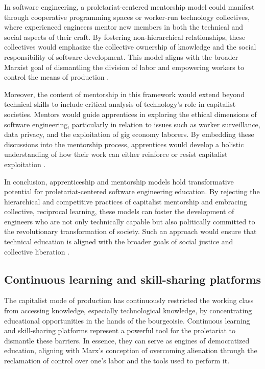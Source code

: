 \begin{refsection}
In software engineering, a proletariat-centered mentorship model could manifest through cooperative programming spaces or worker-run technology collectives, where experienced engineers mentor new members in both the technical and social aspects of their craft. By fostering non-hierarchical relationships, these collectives would emphasize the collective ownership of knowledge and the social responsibility of software development. This model aligns with the broader Marxist goal of dismantling the division of labor and empowering workers to control the means of production \cite[pp.~120]{kling1996computerization}.

Moreover, the content of mentorship in this framework would extend beyond technical skills to include critical analysis of technology’s role in capitalist societies. Mentors would guide apprentices in exploring the ethical dimensions of software engineering, particularly in relation to issues such as worker surveillance, data privacy, and the exploitation of gig economy laborers. By embedding these discussions into the mentorship process, apprentices would develop a holistic understanding of how their work can either reinforce or resist capitalist exploitation \cite[pp.~73]{lanier2011you}.

In conclusion, apprenticeship and mentorship models hold transformative potential for proletariat-centered software engineering education. By rejecting the hierarchical and competitive practices of capitalist mentorship and embracing collective, reciprocal learning, these models can foster the development of engineers who are not only technically capable but also politically committed to the revolutionary transformation of society. Such an approach would ensure that technical education is aligned with the broader goals of social justice and collective liberation \cite[pp.~45]{marx2008capital}.

\subsection{Continuous learning and skill-sharing platforms}

The capitalist mode of production has continuously restricted the working class from accessing knowledge, especially technological knowledge, by concentrating educational opportunities in the hands of the bourgeoisie. Continuous learning and skill-sharing platforms represent a powerful tool for the proletariat to dismantle these barriers. In essence, they can serve as engines of democratized education, aligning with Marx’s conception of overcoming alienation through the reclamation of control over one’s labor and the tools used to perform it. 


\end{refsection}

